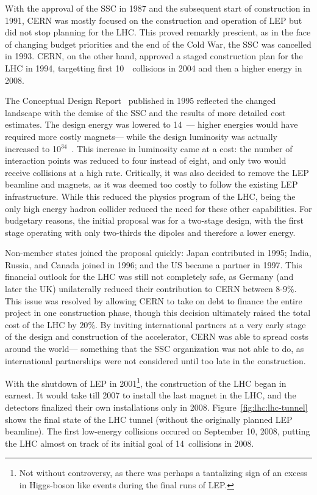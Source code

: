 
With the approval of the SSC in 1987 and the subsequent start of construction in 1991, CERN was mostly focused on the construction and operation of LEP but did not stop planning for the LHC. This proved remarkly prescient, as in the face of changing budget priorities and the end of the Cold War, the SSC was cancelled in 1993.  CERN, on the other hand, approved a staged construction plan for the LHC in 1994, targetting first 10~\TeV~collisions in 2004 and then a higher energy in 2008.

The Conceptual Design Report~\cite{LHCCDR} published in 1995 reflected the changed landscape with the demise of the SSC and the results of more detailed cost estimates. The design energy was lowered to 14~\TeV--- higher energies would have required more costly magnets--- while the design luminosity was actually increased to 10$^{34}$~\lumirate. This increase in luminosity came at a cost: the number of interaction points was reduced to four instead of eight, and only two would receive collisions at a high rate. Critically, it was also decided to remove the LEP beamline and magnets, as it was deemed too costly to follow the existing LEP infrastructure. While this reduced the physics program of the LHC, being the only high energy hadron collider reduced the need for these other capabilities. For budgetary reasons, the initial proposal was for a two-stage design, with the first stage operating with only two-thirds the dipoles and therefore a lower energy.

Non-member states joined the proposal quickly: Japan contributed in 1995; India, Russia, and Canada joined in 1996; and the US became a partner in 1997. This financial outlook for the LHC was still not completely safe, as Germany (and later the UK) unilaterally reduced their contribution to CERN between 8-9$\%$. This issue was resolved by allowing CERN to take on debt to finance the entire project in one construction phase, though this decision ultimately raised the total cost of the LHC by $20\%$. By inviting international partners at a very early stage of the design and construction of the accelerator, CERN was able to spread costs around the world--- something that the SSC organization was not able to do, as international partnerships were not considered until too late in the construction. 


With the shutdown of LEP in 2001\footnote{Not without controversy, as there was perhaps a tantalizing sign of an excess in Higgs-boson like events during the final runs of LEP.}, the construction of the LHC began in earnest. It would take till 2007 to install the last magnet in the LHC, and the detectors finalized their own installations only in 2008. Figure~\ref{fig:lhc:lhc-tunnel} shows the final state of the LHC tunnel (without the originally planned LEP beamline). The first low-energy collisions occured on September 10, 2008, putting the LHC almost on track of its initial goal of 14~\TeV collisions in 2008.

